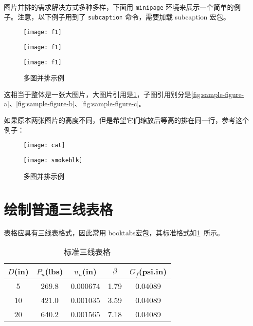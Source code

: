 \documentclass[withoutpreface,bwprint]{cumcmthesis}
\begin{document}
图片并排的需求解决方式多种多样，下面用 \verb|minipage| 环境来展示一个简单的例子。注意，以下例子用到了 \verb|subcaption| 命令，需要加载 subcaption 宏包。

\begin{figure}
    \centering
    \begin{minipage}[c]{0.3\textwidth}
        \centering
        \texttt{[image: f1]}
        \label{fig:sample-figure-a}
    \end{minipage}
    \begin{minipage}[c]{0.3\textwidth}
        \centering
        \texttt{[image: f1]}
        \label{fig:sample-figure-b}
    \end{minipage}
    \begin{minipage}[c]{0.3\textwidth}
        \centering
        \texttt{[image: f1]}
        \label{fig:sample-figure-c}
    \end{minipage}
    \caption{多图并排示例}
    \label{fig:sample-figure}
\end{figure}
这相当于整体是一张大图片，大图片引用是\cref{fig:sample-figure}，子图引用别分是\cref{fig:sample-figure-a}、\cref{fig:sample-figure-b}、\cref{fig:sample-figure-c}。

如果原本两张图片的高度不同，但是希望它们缩放后等高的排在同一行，参考这个例子：
\begin{figure}
    \centering
    \begin{minipage}[c]{0.48\textwidth}
        \centering
        \texttt{[image: cat]}
    \end{minipage}
    \begin{minipage}[c]{0.48\textwidth}
        \centering
        \texttt{[image: smokeblk]}
    \end{minipage}
    \caption{多图并排示例}
\end{figure}

\section{绘制普通三线表格}
表格应具有三线表格式，因此常用 booktabs宏包，其标准格式如\cref{tab:001}~所示。
\begin{table}[!htbp]
    \caption{标准三线表格}\label{tab:001} \centering
    \begin{tabular}{ccccc}
        \toprule[1.5pt]
        $D$(in) & $P_u$(lbs) & $u_u$(in) & $\beta$ & $G_f$(psi.in)\\
        \midrule[1pt]
        5 & 269.8 & 0.000674 & 1.79 & 0.04089\\
        10 & 421.0 & 0.001035 & 3.59 & 0.04089\\
        20 & 640.2 & 0.001565 & 7.18 & 0.04089\\
        \bottomrule[1.5pt]
    \end{tabular}
\end{table}
\end{document}
